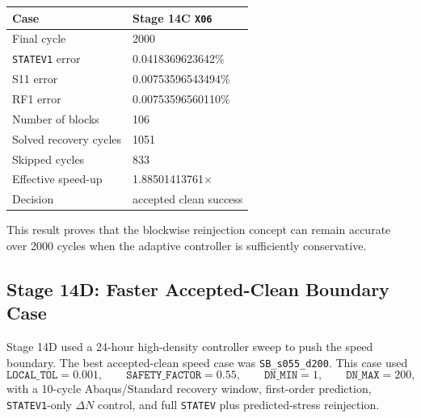 \begin{center}
\begin{tabular}{ll}
\toprule
Case & Stage 14C \texttt{X06} \\
\midrule
Final cycle & 2000 \\
\texttt{STATEV1} error & 0.0418369623642\% \\
S11 error & 0.00753596543494\% \\
RF1 error & 0.00753596560110\% \\
Number of blocks & 106 \\
Solved recovery cycles & 1051 \\
Skipped cycles & 833 \\
Effective speed-up & 1.88501413761$\times$ \\
Decision & accepted clean success \\
\bottomrule
\end{tabular}
\end{center}

This result proves that the blockwise reinjection concept can remain accurate over 2000 cycles when the adaptive controller is sufficiently conservative.

\subsection{Stage 14D: Faster Accepted-Clean Boundary Case}

Stage 14D used a 24-hour high-density controller sweep to push the speed boundary. The best accepted-clean speed case was \texttt{SB\_s055\_d200}. This case used
\[
\texttt{LOCAL\_TOL}=0.001, \qquad
\texttt{SAFETY\_FACTOR}=0.55, \qquad
\texttt{DN\_MIN}=1, \qquad
\texttt{DN\_MAX}=200,
\]
with a 10-cycle Abaqus/Standard recovery window, first-order prediction, \texttt{STATEV1}-only \(\Delta N\) control, and full \texttt{STATEV} plus predicted-stress reinjection.

